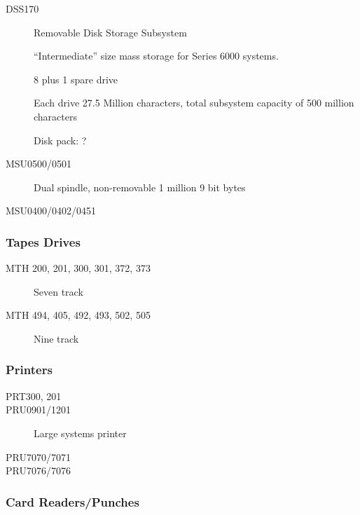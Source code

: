 \documentclass[notitlepage]{report}
\begin{document}
\begin{description}
        \item[DSS170] Removable Disk Storage Subsystem 

“Intermediate” size mass storage for Series 6000 systems.

8 plus 1 spare drive

Each drive 27.5 Million characters, total subsystem capacity of 500 million 
characters

Disk pack: ?

        \item[MSU0500/0501]

Dual spindle, non-removable 1 million 9 bit bytes

        \item[MSU0400/0402/0451]

    \end{description} %

\subsubsection{Tapes Drives}

    \begin{description}

        \item[MTH 200, 201, 300, 301, 372, 373] Seven track
        \item[MTH 494, 405, 492, 493, 502, 505] Nine track

    \end{description} %

\subsubsection{Printers}

    \begin{description}

        \item[PRT300, 201]
        \item[PRU0901/1201] Large systems printer
        \item[PRU7070/7071]
        \item[PRU7076/7076]

    \end{description} %

\subsubsection{Card Readers/Punches}
\end{document}

